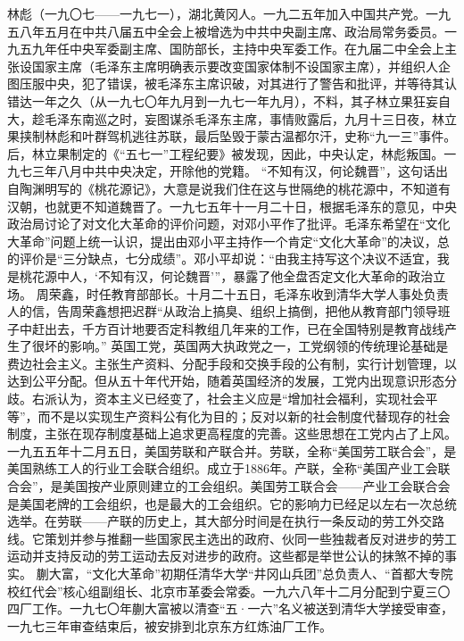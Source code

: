 \begin{maonote}
林彪（一九〇七——一九七一），湖北黄冈人。一九二五年加入中国共产党。一九五八年五月在中共八届五中全会上被增选为中共中央副主席、政治局常务委员。一九五九年任中央军委副主席、国防部长，主持中央军委工作。在九届二中全会上主张设国家主席（毛泽东主席明确表示要改变国家体制不设国家主席），并组织人企图压服中央，犯了错误，被毛泽东主席识破，对其进行了警告和批评，并等待其认错达一年之久（从一九七〇年九月到一九七一年九月），不料，其子林立果狂妄自大，趁毛泽东南巡之时，妄图谋杀毛泽东主席，事情败露后，九月十三日夜，林立果挟制林彪和叶群驾机逃往苏联，最后坠毁于蒙古温都尔汗，史称“九一三”事件。后，林立果制定的《“五七一”工程纪要》被发现，因此，中央认定，林彪叛国。一九七三年八月中共中央决定，开除他的党籍。
“不知有汉，何论魏晋”，这句话出自陶渊明写的《桃花源记》，大意是说我们住在这与世隔绝的桃花源中，不知道有汉朝，也就更不知道魏晋了。一九七五年十一月二十日，根据毛泽东的意见，中央政治局讨论了对文化大革命的评价问题，对邓小平作了批评。毛泽东希望在“文化大革命”问题上统一认识，提出由邓小平主持作一个肯定“文化大革命”的决议，总的评价是“三分缺点，七分成绩”。邓小平却说：“由我主持写这个决议不适宜，我是桃花源中人，‘不知有汉，何论魏晋’”，暴露了他全盘否定文化大革命的政治立场。
周荣鑫，时任教育部部长。十月二十五日，毛泽东收到清华大学人事处负责人的信，告周荣鑫想把迟群“从政治上搞臭、组织上搞倒，把他从教育部门领导班子中赶出去，千方百计地要否定科教组几年来的工作，已在全国特别是教育战线产生了很坏的影响。”
英国工党，英国两大执政党之一，工党纲领的传统理论基础是费边社会主义。主张生产资料、分配手段和交换手段的公有制，实行计划管理，以达到公平分配。但从五十年代开始，随着英国经济的发展，工党内出现意识形态分歧。右派认为，资本主义已经变了，社会主义应是“增加社会福利，实现社会平等”，而不是以实现生产资料公有化为目的；反对以新的社会制度代替现存的社会制度，主张在现存制度基础上追求更高程度的完善。这些思想在工党内占了上风。
一九五五年十二月五日，美国劳联和产联合并。劳联，全称“美国劳工联合会”，是美国熟练工人的行业工会联合组织。成立于1886年。产联，全称“美国产业工会联合会”，是美国按产业原则建立的工会组织。美国劳工联合会——产业工会联合会是美国老牌的工会组织，也是最大的工会组织。它的影响力已经足以左右一次总统选举。在劳联——产联的历史上，其大部分时间是在执行一条反动的劳工外交路线。它策划并参与推翻一些国家民主选出的政府、伙同一些独裁者反对进步的劳工运动并支持反动的劳工运动去反对进步的政府。这些都是举世公认的抹煞不掉的事实。
蒯大富，“文化大革命”初期任清华大学“井冈山兵团”总负责人、“首都大专院校红代会”核心组副组长、北京市革委会常委。一九六八年十二月分配到宁夏三〇四厂工作。一九七〇年蒯大富被以清查“五·一六”名义被送到清华大学接受审查，一九七三年审查结束后，被安排到北京东方红炼油厂工作。

\end{maonote}
